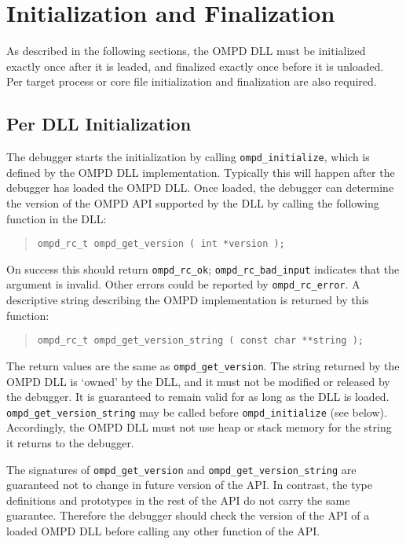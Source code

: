 \section{Initialization and Finalization}

As described in the following sections, the OMPD DLL must be
initialized exactly once after it is leaded, and finalized exactly once
before it is unloaded. Per target process or core file initialization and
finalization are also required.

\subsection{Per DLL Initialization}

The debugger starts the initialization by calling
\texttt{ompd\_initialize}, which is defined by the OMPD DLL implementation.
Typically this will happen after the debugger has loaded the
OMPD DLL.
Once loaded, the debugger can determine the version of the OMPD
API supported by the DLL by calling the following function in the DLL:
\begin{quote}
\begin{lstlisting}
ompd_rc_t ompd_get_version ( int *version );
\end{lstlisting}
\end{quote}
On success this should return \verb|ompd_rc_ok|;
\verb|ompd_rc_bad_input| indicates that the argument is invalid.
Other errors could be reported by \verb|ompd_rc_error|.
A descriptive string describing the OMPD implementation
is returned by this function:
\begin{quote}
\begin{lstlisting}
ompd_rc_t ompd_get_version_string ( const char **string );
\end{lstlisting}
\end{quote}
The return values are the same as \verb|ompd_get_version|.
The string returned by the OMPD DLL is `owned' by the DLL,
and it must not be modified or released by the debugger.
It is guaranteed to remain valid for as long as the DLL is loaded.
\texttt{ompd\_get\_version\_string} may be called before
\texttt{ompd\_initialize} (see below).
Accordingly, the OMPD DLL must not use heap or stack memory for
the string it returns to the debugger.

The signatures of \texttt{ompd\_get\_version} and
\texttt{ompd\_get\_version\_string} are guaranteed not to change
in future version of the API.
In contrast, the type definitions and prototypes in the rest of the API
do not carry the same guarantee.
Therefore the debugger should check the version of the API of
a loaded OMPD DLL before calling any other function of the API.

